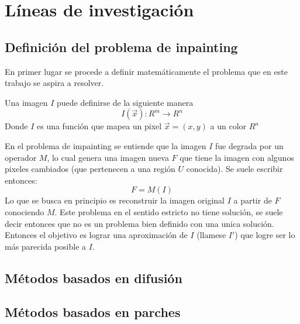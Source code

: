 \documentclass[assd_tpf_main.tex]{subfiles}
\begin{document}
\section{L\'ineas de investigaci\'on}

\subsection{Definici\'on del problema de inpainting}

En primer lugar se procede a definir matemáticamente el problema que en este trabajo se aspira a resolver. 

Una imagen $I$ puede definirse de la siguiente manera
\begin{equation}
I(\vec x): R^{m} \to R^{n}
\end{equation}
Donde $I$ es una función que mapea un pixel $\vec x=(x,y)$ a un color $R^{n}$

En el problema de impainting se entiende que la imagen $I$ fue degrada por un operador $M$, lo cual genera una imagen nueva $F$ que tiene la imagen con algunos pixeles cambiados (que pertenecen a una región $U$ conocida). Se suele escribir entonces:
\begin{equation}
F=M(I)
\end{equation}
Lo que se busca en principio es reconstruir la imagen original $I$ a partir de $F$ conociendo $M$. Este problema en el sentido estricto no tiene solución, se suele decir entonces que no es un problema bien definido con una unica solución.
Entonces el objetivo es lograr una aproximación de $I$ (llamese $I'$) que logre ser lo más parecida posible a $I$.
\subsection{Métodos basados en difusión}


\subsection{Métodos basados en parches}
\end{document}
